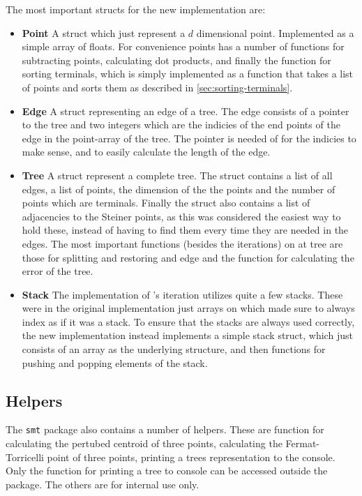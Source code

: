 The most important structs for the new implementation are:
%
\begin{itemize}
\item \textbf{Point} \quad A struct which just represent a $d$ dimensional
  point. Implemented as a simple array of floats. For convenience points has a
  number of functions for subtracting points, calculating dot products, and
  finally the function for sorting terminals, which is simply implemented as a
  function that takes a list of points and sorts them as described in \cref{sec:sorting-terminals}.
\item \textbf{Edge} \quad A struct representing an edge of a tree. The edge
  consists of a pointer to the tree and two integers which are the indicies of
  the end points of the edge in the point-array of the tree. The pointer is
  needed of for the indicies to make sense, and to easily calculate the length
  of the edge.
\item \textbf{Tree} \quad A struct represent a complete tree. The struct
  contains a list of all edges, a list of points, the dimension of the the
  points and the number of points which are terminals. Finally the struct also
  contains a list of adjacencies to the Steiner points, as this was considered
  the easiest way to hold these, instead of having to find them every time they
  are needed in the edges. The most important functions (besides the iterations)
  on at tree are those for splitting and restoring and edge and the function for
  calculating the error of the tree.
\item \textbf{Stack} \quad The implementation of \citeauthor{smith1992}'s
  iteration utilizes quite a few stacks. These were in the original
  implementation just arrays on which \citeauthor{smith1992} made sure to always
  index as if it was a stack. To ensure that the stacks are always used
  correctly, the new implementation instead implements a simple stack struct,
  which just consists of an array as the underlying structure, and then
  functions for pushing and popping elements of the stack.
\end{itemize}

\subsection{Helpers}
\label{sec:helpers}

The \texttt{smt} package also contains a number of helpers. These are function
for calculating the pertubed centroid of three points, calculating the
Fermat-Torricelli point of three points, printing a trees representation to the
console. Only the function for printing a tree to console can be accessed
outside the package. The others are for internal use only.

